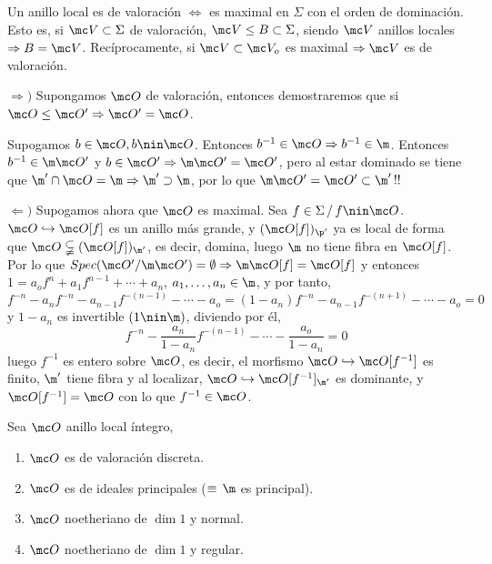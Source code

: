 \begin{teo}
    Un anillo local es de valoraci\'on $\iff$ es maximal en $\Sigma$ con el orden de dominaci\'on. Esto es, si $\mc V \subset \Sigma$ de valoraci\'on, $\mc V \le B \subset \Sigma$, siendo $\mc V$ anillos locales $\Rightarrow B = \mc V$. Rec\'iprocamente, si $\mc V \subset \mc V_o$ es maximal $\Rightarrow \mc V$ es de valoraci\'on.
\end{teo}
\begin{dem}
    $\Rightarrow)$ Supongamos $\mc O$ de valoraci\'on, entonces demostraremos que si $\mc O \le \mc O' \Rightarrow \mc O' = \mc O$. 

    Supogamos $b\in \mc O, b\nin \mc O$. Entonces $b^{-1} \in \mc O \Rightarrow b^{-1} \in \m$. Entonces $b^{-1} \in \m \mc O '$ y $b\in \mc O' \Rightarrow \m \mc O' = \mc O'$, pero al estar dominado se tiene que $\m' \cap \mc O = \m \Rightarrow \m'\supset \m$, por lo que $\m \mc O ' =\mc O' \subset \m' \, !!$

    $\Leftarrow)$ Supogamos ahora que $\mc O$ es maximal. Sea $f\in \Sigma \, / \, f\nin \mc O$. $\mc O \hookrightarrow \mc O[f]$ es un anillo m\'as grande, y $(\mc O[f])_{\p'}$ ya es local de forma que $\mc O \subsetneqq (\mc O[f])_{\m'}$, es decir, domina, luego $\m$ no tiene fibra en $\mc O[f]$. Por lo que $Spec(\mc O' / \m \mc O') = \emptyset\Rightarrow \m \mc O[f] = \mc O[f]$ y entonces $1=a_of^n + a_1 f^{n-1} + \cdots + a_n$, $a_1, \ldots, a_n \in \m$, y por tanto, 
    $$f^{-n} -a_n f^{-n} - a_{n-1} f^{-(n-1)} - \cdots - a_o = (1-a_n) f^{-n} - a_{n-1} f^{-(n+1)} - \cdots - a_o = 0 $$
    y $1-a_n$ es invertible $(1\nin \m)$, diviendo por \'el, 
    $$f^{-n} - \frac{a_n}{1-a_n} f^{-(n-1)} - \cdots - \frac{a_o}{1-a_n} = 0 $$
    luego $f^{-1}$ es entero sobre $\mc O$, es decir, el morfismo $\mc O \hookrightarrow \mc O[f^{-1}]$ es finito, $\m'$ tiene fibra y al localizar, $\mc O \hookrightarrow \mc O[f^{-1}]_{\m'}$ es dominante, y $\mc O[f^{-1}] = \mc O $ con lo que $f^{-1} \in \mc O$. 
\end{dem}
\begin{teo}
    Sea $\mc O$ anillo local \'integro, 
    \begin{enumerate}[1)]
        \item $\mc O$ es de valoraci\'on discreta.
        \item $\mc O$ es de ideales principales ($\equiv \, \m$ es principal).
        \item $\mc O$ noetheriano de $\dim 1$ y normal.
        \item $\mc O$ noetheriano de $\dim 1$ y regular.
    \end{enumerate}
\end{teo}
